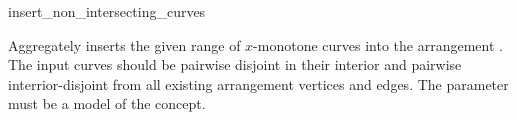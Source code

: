 
\ccRefPageBegin

\begin{ccRefFunction}{insert_non_intersecting_curves}


   {Aggregately inserts the given range of $x$-monotone curves
    \ccc{[first,last)} into the arrangement . The input curves should
    be pairwise disjoint in their interior and pairwise interrior-disjoint
    from all existing arrangement vertices and edges. 
    The  parameter must be a model of the
     concept.
    }

\end{ccRefFunction}

\ccRefPageEnd
